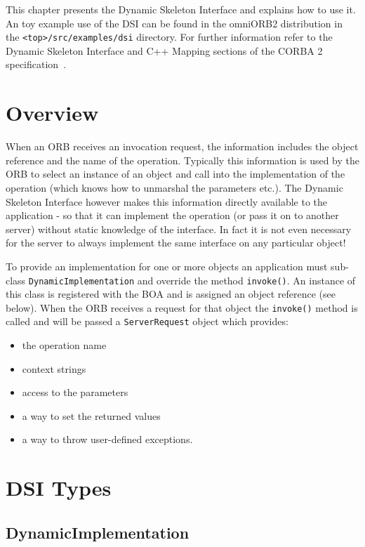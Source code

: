 \documentclass[11pt,twoside,onecolumn]{book}
\begin{document}
This chapter presents the Dynamic Skeleton Interface and explains how to
use it.
An toy example use of the DSI can be found in the omniORB2 distribution in
the {\tt <top>/src/examples/dsi} directory.
For further information refer to the Dynamic Skeleton Interface
and C++ Mapping sections of the CORBA 2 specification~\cite{corba2-spec}.


\section{Overview}

When an ORB receives an invocation request, the information includes
the object reference and the name of the operation. Typically this information
is used by the
ORB to select an instance of an object and call into the implementation of
the operation (which knows how to unmarshal the parameters etc.).
The Dynamic Skeleton Interface however makes this
information directly available to the application - so that it can
implement the operation (or pass it on to another server) without static
knowledge of the interface. In fact it is not even necessary for the server
to always implement the same interface on any particular object!

To provide an implementation for one or more objects an application must
sub-class {\tt DynamicImplementation} and override the method {\tt invoke()}.
An instance of this class is registered with the BOA and is assigned an
object reference (see below). When the ORB receives a request for that
object the {\tt invoke()} method is called and will be passed a
{\tt ServerRequest} object which provides:
\begin{itemize}
\item the operation name
\item context strings
\item access to the parameters
\item a way to set the returned values
\item a way to throw user-defined exceptions.
\end{itemize}


\section{DSI Types}

\subsection{DynamicImplementation}
\end{document}
